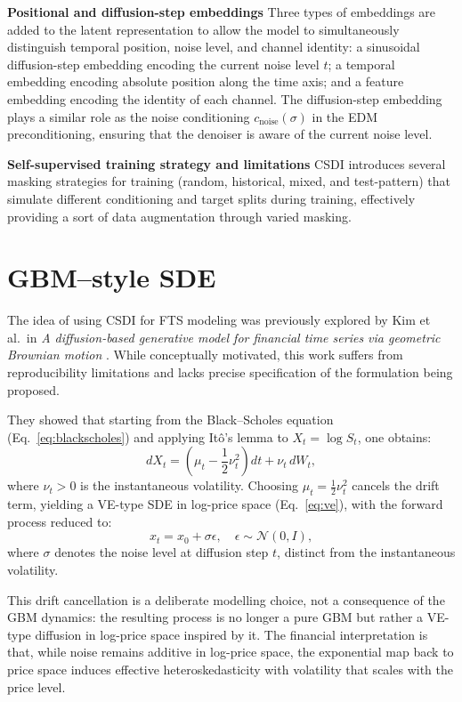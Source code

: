 \textbf{Positional and diffusion-step embeddings} \quad Three types of embeddings are added to the latent representation to allow the model to simultaneously distinguish temporal position, noise level, and channel 
identity: a sinusoidal diffusion-step embedding encoding the current noise level 
$t$; a temporal embedding encoding absolute position along the time axis; and a 
feature embedding encoding the identity of each channel. The diffusion-step 
embedding plays a similar role as the noise conditioning $c_{\text{noise}}(\sigma)$ 
in the EDM preconditioning, ensuring that the denoiser is aware of the current noise level. 

\textbf{Self-supervised training strategy and limitations} \quad CSDI introduces several masking strategies for training (random, historical, 
mixed, and test-pattern) that simulate different conditioning and target splits 
during training, effectively providing a sort of data augmentation through varied 
masking.

\section{GBM--style SDE}
\label{sec:gbm_sde_ch2}
The idea of using CSDI for FTS modeling was previously explored by Kim et al.\ in \emph{A diffusion-based generative model for financial time series via geometric Brownian motion} \cite{kim2025diffusion}. While conceptually motivated, this work suffers from reproducibility limitations and lacks precise specification of the formulation being proposed.

They showed that starting from the Black--Scholes equation (Eq.~\ref{eq:blackscholes}) and 
applying It\^{o}'s lemma to \(X_t = \log S_t\), one obtains:
\[
    dX_t = \left(\mu_t - \frac{1}{2}\nu_t^2\right)dt + \nu_t\,dW_t,
\]
where \(\nu_t > 0\) is the instantaneous volatility. Choosing 
\(\mu_t = \frac{1}{2}\nu_t^2\) cancels the drift term, yielding a 
VE-type SDE in log-price space (Eq.~\ref{eq:ve}), with the forward 
process reduced to:
\begin{equation}
    \label{eq:forward_ve}
    x_t = x_0 + \sigma\epsilon, \quad \epsilon \sim \mathcal{N}(0, I),
\end{equation}
where \(\sigma\) denotes the noise level at diffusion step \(t\), 
distinct from the instantaneous volatility. 

This drift cancellation is a deliberate 
modelling choice, not a consequence of the GBM dynamics: the resulting 
process is no longer a pure GBM but rather a VE-type diffusion in 
log-price space inspired by it. The financial interpretation is that, 
while noise remains additive in log-price space, the exponential map back to price space induces effective heteroskedasticity with volatility that scales with the price level.

